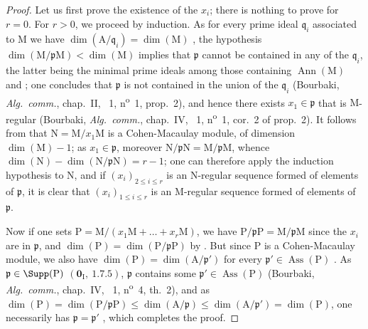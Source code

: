 \begin{proof}
Let us first prove the existence of the $x_i$; there is nothing to prove for $r=0$.
For $r>0$, we proceed by induction.
As for every prime ideal $\mathfrak{q}_i$ associated to $\mathrm{M}$ we have $\dim(\mathrm{A}/\mathfrak{q}_i)=\dim(\mathrm{M})$ , the hypothesis $\dim(\mathrm{M}/\mathfrak{p}\mathrm{M})<\dim(\mathrm{M})$ implies that $\mathfrak{p}$ cannot be contained in any of the $\mathfrak{q}_i$, the latter being the minimal prime ideals among those containing $\operatorname{Ann}(\mathrm{M})$  and ; one concludes that $\mathfrak{p}$ is not contained in the union of the $\mathfrak{q}_i$ (Bourbaki, \emph{Alg.~comm.}, chap.~II, \textsection~1, n\textsuperscript{o}~1, prop.~2), and hence there exists $x_1\in\mathfrak{p}$ that is $\mathrm{M}$-regular (Bourbaki, \emph{Alg.~comm.}, chap.~IV, \textsection~1, n\textsuperscript{o}~1, cor.~2 of prop.~2).
It follows from  that $\mathrm{N}=\mathrm{M}/x_1\mathrm{M}$ is a Cohen-Macaulay module, of dimension $\dim(\mathrm{M})-1$; as $x_1\in\mathfrak{p}$, moreover $\mathrm{N}/\mathfrak{p}\mathrm{N}=\mathrm{M}/\mathfrak{p}\mathrm{M}$, whence $\dim(\mathrm{N})-\dim(\mathrm{N}/\mathfrak{p}\mathrm{N})=r-1$; one can therefore apply the induction hypothesis to $\mathrm{N}$, and if $(x_i)_{2\leq i\leq r}$ is an $\mathrm{N}$-regular sequence formed of elements of $\mathfrak{p}$, it is clear that $(x_i)_{1\leq i\leq r}$ is an $\mathrm{M}$-regular sequence formed of elements of $\mathfrak{p}$.

Now if one sets $\mathrm{P}=\mathrm{M}/(x_1\mathrm{M}+\ldots+x_r\mathrm{M})$, we have $\mathrm{P}/\mathfrak{p}\mathrm{P}=\mathrm{M}/\mathfrak{p}\mathrm{M}$ since the $x_i$ are in $\mathfrak{p}$, and $\dim(\mathrm{P})=\dim(\mathrm{P}/\mathfrak{p}\mathrm{P})$ by .
But since $\mathrm{P}$ is a Cohen-Macaulay module, we also have $\dim(\mathrm{P})=\dim(\mathrm{A}/\mathfrak{p}')$ for every $\mathfrak{p}'\in\operatorname{Ass}(\mathrm{P})$ .
As $\mathfrak{p}\in\Supp(\mathrm{P})$ $(\mathbf{0}_\mathrm{I},~1.7.5)$, $\mathfrak{p}$ contains some $\mathfrak{p}'\in\operatorname{Ass}(\mathrm{P})$ (Bourbaki, \emph{Alg.~comm.}, chap.~IV, \textsection~1, n\textsuperscript{o}~4, th.~2), and as $\dim(\mathrm{P})=\dim(\mathrm{P}/\mathfrak{p}\mathrm{P})\leq\dim(\mathrm{A}/\mathfrak{p})\leq\dim(\mathrm{A}/\mathfrak{p}')=\dim(\mathrm{P})$, one necessarily has $\mathfrak{p}=\mathfrak{p}'$ , which completes the proof.
\end{proof}

